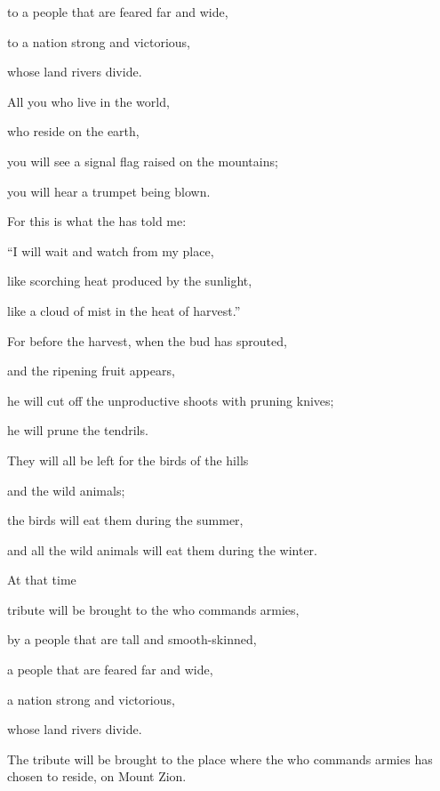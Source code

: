 {\par }{\Q to
a people
that
are feared
far and wide,
\par }{\Q to a nation
strong
and victorious,
\par }{\Q whose land
rivers
divide.
\par }{\Q {}All
you who live
in the world,
\par }{\Q who reside
on the earth,
\par }{\Q you will see
a signal flag
raised on the mountains;
\par }{\Q you will hear
a trumpet
being blown.
\par }{\Q {}For
this is what
the {}
has told
me:
\par }{\Q “I will wait and watch from my place,
\par }{\Q like
scorching
heat
produced by
the sunlight,
\par }{\Q like a cloud
of mist
in the heat
of harvest.”
\par }{\Q {}For
before
the harvest,
when the bud
has sprouted,
\par }{\Q and the ripening
fruit
appears,
\par }{\Q he will cut off
the unproductive shoots
with pruning knives;
\par }{\Q he will prune
the tendrils.
\par }{\Q {}They will all
be left
for the birds
of the hills
\par }{\Q and the wild animals;
\par }{\Q the birds
will eat them during the summer,
\par }{\Q and all
the wild animals
will eat them during the winter.
\par }{\Q {}At that
time
\par }{\Q tribute
will be brought
to the
{}
who commands armies,
\par }{\Q by a people
that are tall
and smooth-skinned,
\par }{\Q a people
that
are feared
far and wide,
\par }{\Q a nation
strong
and victorious,
\par }{\Q whose land
rivers
divide.
\par }{\Q The tribute will be brought to
the place
where the
{}
who commands armies
has chosen to reside, on Mount
Zion.

}
